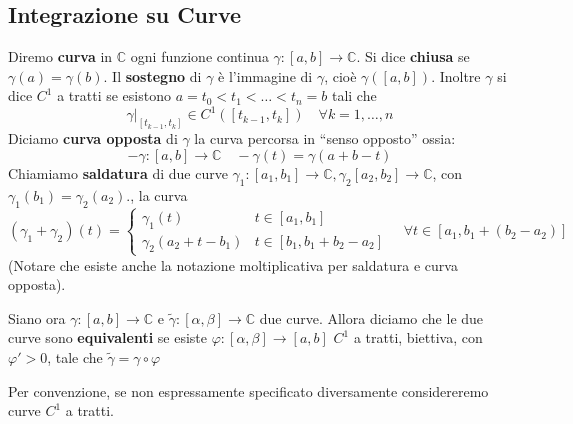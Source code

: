 \subsection{Integrazione su Curve}
\begin{definition}
    Diremo \textbf{curva} in \(\mathbb{C}\) ogni funzione continua \(\gamma : [a,b] \to
    \mathbb{C}\). Si dice \textbf{chiusa} se \(\gamma(a) = \gamma(b)\). Il
    \textbf{sostegno} di \(\gamma\) è l'immagine di \(\gamma\), cioè
    \(\gamma([a,b])\). Inoltre \(\gamma\) si dice \(C^{1}\) a tratti se esistono
    \(a=t_{0}<t_{1}<\dots<t_{n}=b\) tali che 
    \[
        \gamma|_{[t_{k-1} , t_k]} \in C^{1}([t_{k-1}, t_k]) \quad \forall k = 1,
        \dots, n
    \]
    Diciamo \textbf{curva opposta} di \(\gamma\) la curva percorsa in
    ``senso opposto'' ossia:
    \[
        -\gamma : [a,b] \to \mathbb{C} \quad -\gamma(t) = \gamma(a+b-t)
    \]
    Chiamiamo \textbf{saldatura} di due curve \(\gamma_1 : [a_{1}, b_{1}] \to
    \mathbb{C}, \gamma_2 [a_{2}, b_{2}] \to \mathbb{C}\), con
    \(\gamma_{1}(b_{1}) = \gamma_{2}(a_{2}). \), la curva 
    \[
        (\gamma_{1} + \gamma_{2})(t) = \begin{cases}
            \gamma_{1}(t) & t \in [a_{1}, b_{1}] \\
            \gamma_{2}(a_{2} + t - b_{1}) & t \in [b_{1}, b_{1} + b_{2} - a_{2}]
        \end{cases}
        \quad \forall t \in [a_{1}, b_{1} + (b_{2}-a_{2})]
    \]
    (Notare che esiste anche la notazione moltiplicativa per saldatura e curva
    opposta).

Siano ora \(\gamma: [a,b] \to \mathbb{C}\) e \(\tilde{\gamma} : [\alpha, \beta]
\to \mathbb{C}\) due curve. Allora diciamo che le due curve sono
\textbf{equivalenti} se esiste \(\varphi : [\alpha, \beta] \to [a,b]\) \(C^{1}\)
a tratti, biettiva, con \(\varphi'>0\), tale che
\(
    \tilde\gamma = \gamma \circ \varphi 
\)
\end{definition}

Per convenzione, se non espressamente specificato diversamente considereremo
curve \(C^{1}\) a tratti.

